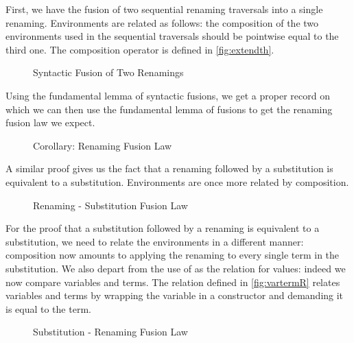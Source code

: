 First, we have the fusion of two sequential renaming traversals into a single
renaming. Environments are related as follows: the composition of the two
environments used in the sequential traversals should be pointwise equal to
the third one. The composition operator  is defined in \cref{fig:extendth}.

\begin{figure}[h]
\caption{Syntactic Fusion of Two Renamings\label{fig:renrenfus}}
\end{figure}

Using the fundamental lemma of syntactic fusions, we get a proper  record
on which we can then use the fundamental lemma of fusions to get the renaming fusion
law we expect.

\begin{figure}[h]
\caption{Corollary: Renaming Fusion Law\label{fig:renren}}
\end{figure}

A similar proof gives us the fact that a renaming followed by a substitution is equivalent
to a substitution. Environments are once more related by composition.

\begin{figure}[h]
\caption{Renaming - Substitution Fusion Law\label{fig:rensub}}
\end{figure}

For the proof that a substitution followed by a renaming is equivalent to a
substitution, we need to relate the environments in a different manner:
composition now amounts to applying the renaming to every single term in the
substitution. We also depart from the use of  as the relation for values:
indeed we now compare variables and terms. The relation  defined in
\cref{fig:vartermR} relates variables and terms by wrapping the variable in a
 constructor and demanding it is equal to the term.

\begin{figure}[h]
\caption{Substitution - Renaming Fusion Law\label{fig:subren}}
\end{figure}

